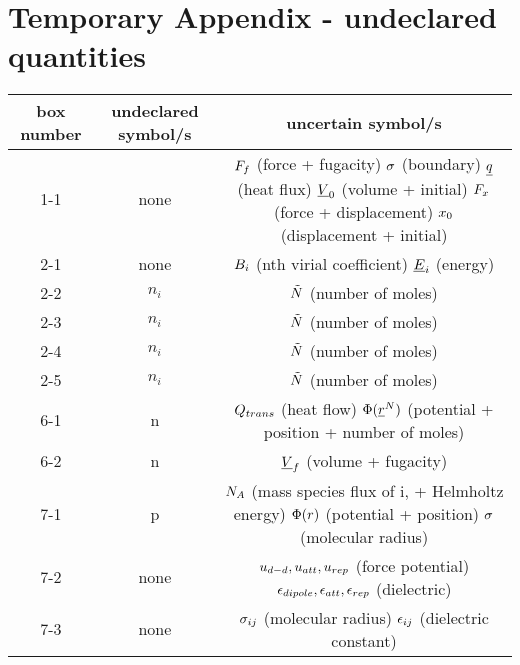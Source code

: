 \section{Temporary Appendix - undeclared quantities}

\begin{tabular} { | c | c | c | } 
 \hline
    \textbf{box number}
    & \textbf{undeclared symbol/s} 
    & \textbf{uncertain symbol/s} \\
 \hline
    1-1 & none & \shortstack{$\force_{\fug}$ (force + fugacity)\\ $\bound$ (boundary) \\ $\uline{\heatflux}$ (heat flux) \\ $\uline{\vol}_{\init}$ (volume + initial) \\ $\force_{\disp}$ (force + displacement)\\ $\disp_{\init}$ (displacement + initial)}\\  \hline
    2-1 & none & \shortstack{$\virialcoeff{i}$ (nth virial coefficient) \\ $\uline{\energy}_{i}$ (energy) }\\ \hline
    2-2 & $n_{i}$ & $\tilde{\nummoles}$ (number of moles) \\ \hline
    2-3 & $n_{i}$ & $\tilde{\nummoles}$ (number of moles) \\ \hline
    2-4 & $n_{i}$ & $\tilde{\nummoles}$ (number of moles) \\ \hline
    2-5 & $n_{i}$ & $\tilde{\nummoles}$ (number of moles) \\ \hline
    6-1 & n & \shortstack{$\heatflow_{trans}$ (heat flow) \\ $\pot(\uline{\pos}^{\nummoles})$ (potential + position + number of moles)} \\ \hline
    6-2 & n & $\uline{\vol}_{\fug}$ (volume + fugacity) \\ \hline
    7-1 & p & \shortstack{$\massspecflux{\helmholtz}$ (mass species flux of i, + Helmholtz energy) \\ $\pot(\pos)$ (potential + position) \\ $\molecrad$ (molecular radius)} \\ \hline
    7-2 & none & \shortstack{$\forcepot_{d-d}, \forcepot_{att}, \forcepot_{rep}$ (force potential) \\ $\dielec_{dipole}, \dielec_{att}, \dielec_{rep}$ (dielectric)} \\ \hline
    7-3 & none & \shortstack{$\molecrad_{ij}$ (molecular radius) \\ $\dielec_{ij}$ (dielectric constant)} \\ \hline

\end{tabular}
